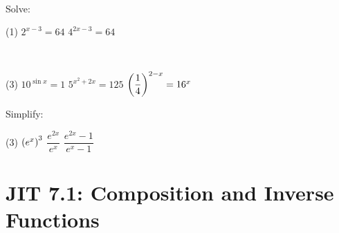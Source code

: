 \documentclass[answers]{exam}
\begin{document}
  
  \pagebreak
  \begin{ex*}\ 
  
  \noindent
  \begin{minipage}[t]{0.625\linewidth}
    
    Solve:
    \begin{tasks}[after-item-skip=0.125\paperheight](1)
      \task $2^{x-3}=64$
      \task $4^{2x-3}=64$
    \end{tasks}
  \end{minipage}%
  \begin{minipage}[t]{0.375\linewidth}\ 
  
    \flushright
  \end{minipage}%
  \begin{tasks}[resume, after-item-skip=0.075\paperheight](3)
    \task $10^{\sin x}=1$
    \task $5^{x^2+2x}=125$
    \task ${\left(\dfrac{1}{4}\right)}^{2-x}=16^x$
  \end{tasks}
  \end{ex*}
  
  \begin{ex*}
    Simplify:
    \begin{tasks}(3)
      \task ${\left(e^x\right)}^3$
      \task $\dfrac{e^{2x}}{e^x}$
      \task $\dfrac{e^{2x}-1}{e^x-1}$
    \end{tasks}
  \end{ex*}
  
  \pagebreak
  
  \section{JIT 7.1: Composition and Inverse Functions}
  
\end{document}
